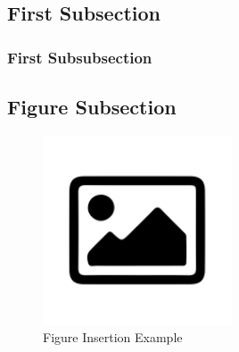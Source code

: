 \subsection{First Subsection}\label{subsec:first-subsection}
\lipsum[1]

\subsubsection{First Subsubsection}\label{subsubsec:first-subsubsection}
\lipsum[1]

\subsection{Figure Subsection}\label{subsec:figure-subsection}
\begin{figure}[htbp]
    \centering
    \includegraphics[width=0.5\textwidth]{resources/default}
    \caption{
        Figure Insertion Example
    }
    \label{fig:figure-insertion-example}
\end{figure}